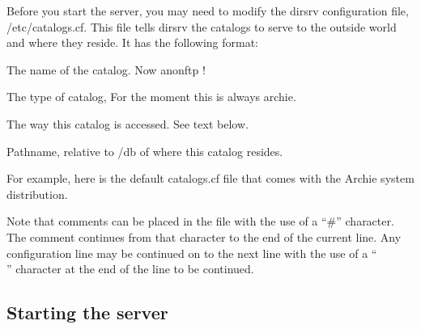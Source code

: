 Before you start the server, you may need to modify the dirsrv configuration
file, \archie/etc/catalogs.cf. This file tells dirsrv the catalogs to serve to
the outside world and where they reside. It has the following format:



 The name of the catalog. Now anonftp !

 The type of catalog, For the moment this is always archie.

 The way this catalog is accessed. See text below.

 Pathname, relative to \archie/db of where this catalog resides.

For example, here is the default catalogs.cf file that comes with the Archie
system distribution.


\param{\#}








Note that comments can be placed in the file with the use of a ``\#''
character. The comment continues from that character to the end of the current
line. Any configuration line may be continued on to the next line with the use
of a ``\\'' character at the end of the line to be continued.




\subsection{Starting the server}

